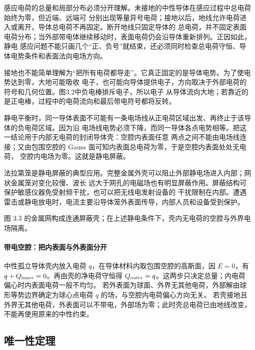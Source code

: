\inductionSequenceFigure
{}

感应电荷的总量和局部分布必须分开理解。未接地的中性导体在感应过程中总电荷始终为零，但近端、远端可
分别出现等量异号电荷；接地以后，地线允许电荷进入或离开，导体总电荷不再固定。断开地线只固定导体的
总电荷，并不固定表面电荷分布；当外部带电体继续移动时，表面电荷仍会沿导体重新排列。正因如此，静电
感应问题不能只画几个“正、负号”就结束，还必须同时检查总电荷守恒、导体电势条件和表面法向电场方向。

接地也不能简单理解为“把所有电荷都导走”。它真正固定的是导体电势。为了使电势达到零，大地可能吸收
电子，也可能向导体提供电子，方向取决于外部电荷的符号和几何位置。图3.2中负电棒排斥电子，所以电子
从导体流向大地；若靠近的是正电棒，过程中的电荷流向和最后带电符号都将反转。

静电平衡时，同一导体表面不可能有一条电场线从正电荷区域出发、再终止于该导体的负电荷区域。因为沿
电场线电势必须下降，而同一导体各点电势相等。把这一结论用于内部无电荷的封闭导体壳：空腔内表面任意
两点之间不能由电场线连接；又由包围空腔的 Gauss 面可知内表面总电荷为零，于是空腔内表面处处无电荷，
空腔内电场为零。这就是静电屏蔽。

法拉第笼是静电屏蔽的典型应用。完整金属外壳可以阻止外部静电场进入内部；网状金属笼对变化较慢、波长
远大于网孔的电磁场也有明显屏蔽作用。屏蔽结构可保护敏感仪器免受射频干扰，也可以把无线电发射设备的
干扰限制在内部。遭遇雷击或静电放电时，电流主要沿导体笼外表面传导，内部人员和设备受到保护。

图 3.3 的金属网构成连通屏蔽壳；在上述静电条件下，壳内无电荷的空腔与外界电场隔离。

\faradayCageFigure
{}


\paragraph{带电空腔：把内表面与外表面分开}
中性孤立导体壳内放入电荷 $q$，在导体材料内取包围空腔的高斯面，因 $E=0$，有
$q+Q_{\rm inner}=0$。再由壳的净电荷守恒得 $Q_{\rm outer}=q$。这两步只决定总量；内电荷偏心时内表面电荷一般不均匀。
若外表面为球面、外界无其他电荷，外部解由球形等势边界确定为球心点电荷 $q$ 的场，与空腔内电荷偏心方向无关。
若壳接地且外界无其他电荷，外表面可以不带电，外部场为零；此时壳总电荷已由地线改变，不能再使用原来的中性约束。

\subsection*{唯一性定理}

